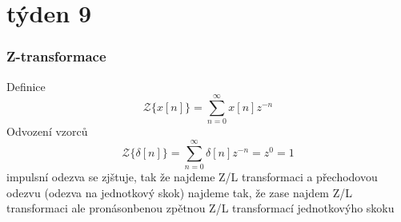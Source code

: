 \documentclass{article}
\begin{document}
\section*{týden 9}
	\subsubsection*{Z-transformace}
		Definice
		\[\mathcal{Z}\{x[n]\}=\sum_{n=0}^{\infty}x[n]z^{-n}\]
		Odvození vzorců
		\[\mathcal{Z}\{\delta[n]\}=\sum_{n=0}^{\infty}\delta[n]z^{-n}=z^0=1\]
		impulsní odezva se zjštuje, tak že najdeme Z/L transformaci
		a přechodovou odezvu (odezva na jednotkový skok) najdeme tak,
		že zase najdem Z/L transformaci ale pronásonbenou 
		zpětnou Z/L transformací jednotkovýho skoku
\end{document}
